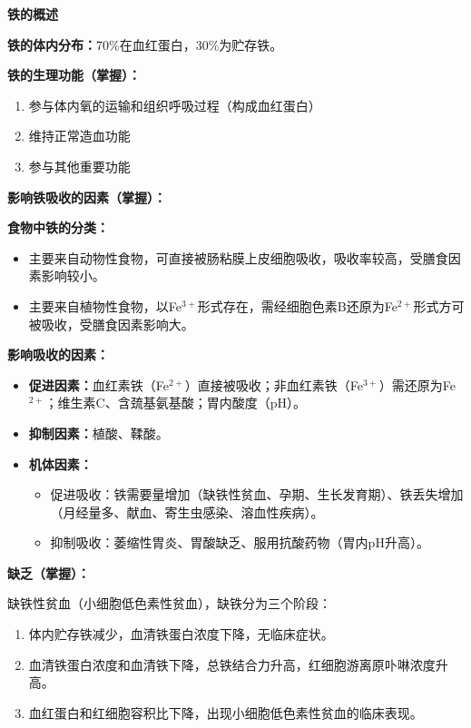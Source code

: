 \begin{keybox}
\textbf{铁的概述}

\textbf{铁的体内分布：}70\%在血红蛋白，30\%为贮存铁。

\textbf{铁的生理功能（掌握）：}
\begin{enumerate}[leftmargin=*]
    \item 参与体内氧的运输和组织呼吸过程（构成血红蛋白）
    \item 维持正常造血功能
    \item 参与其他重要功能
\end{enumerate}

\difficulty \textbf{影响铁吸收的因素（掌握）：}

\textbf{食物中铁的分类：}
\begin{itemize}[leftmargin=*]
    \item {}主要来自动物性食物，可直接被肠粘膜上皮细胞吸收，吸收率较高，受膳食因素影响较小。
    \item {}主要来自植物性食物，以Fe$^{3+}$形式存在，需经细胞色素B还原为Fe$^{2+}$形式方可被吸收，受膳食因素影响大。
\end{itemize}

\textbf{影响吸收的因素：}
\begin{itemize}[leftmargin=*]
    \item \textbf{促进因素：}血红素铁（Fe$^{2+}$）直接被吸收；非血红素铁（Fe$^{3+}$）需还原为Fe$^{2+}$；维生素C、含巯基氨基酸；胃内酸度（pH）。
    \item \textbf{抑制因素：}植酸、鞣酸。
    \item \textbf{机体因素：}
    \begin{itemize}[leftmargin=*]
        \item 促进吸收：铁需要量增加（缺铁性贫血、孕期、生长发育期）、铁丢失增加（月经量多、献血、寄生虫感染、溶血性疾病）。
        \item 抑制吸收：萎缩性胃炎、胃酸缺乏、服用抗酸药物（胃内pH升高）。
    \end{itemize}
\end{itemize}

\difficulty \textbf{缺乏（掌握）：}

缺铁性贫血（小细胞低色素性贫血），缺铁分为三个阶段：
\begin{enumerate}[leftmargin=*]
    \item {}体内贮存铁减少，血清铁蛋白浓度下降，无临床症状。
    \item {}血清铁蛋白浓度和血清铁下降，总铁结合力升高，红细胞游离原卟啉浓度升高。
    \item {}血红蛋白和红细胞容积比下降，出现小细胞低色素性贫血的临床表现。
\end{enumerate}


\end{keybox}

